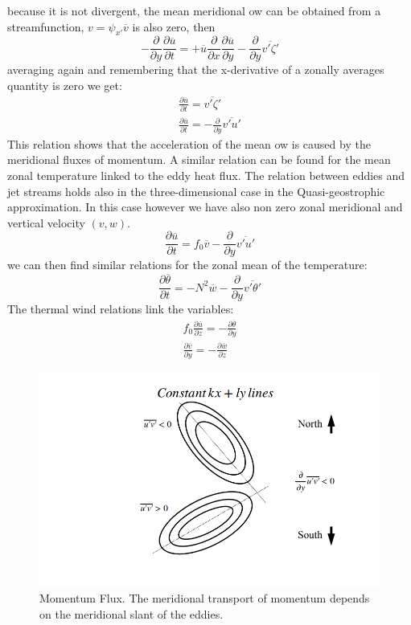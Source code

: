 because it is not divergent, the mean meridional ow can be obtained from a streamfunction, $v=\psi_{x'}\overline{v}$ is also zero, then
$$-\frac{\partial}{\partial y}\frac{\partial\overline{u}}{\partial t}=+\overline{u}\frac{\partial}{\partial x}\frac{\partial\overline{u}}{\partial y}-\frac{\partial}{\partial y}\overline{v'\zeta'}$$
averaging again and remembering that the x-derivative of a zonally averages quantity is zero we get:
\begin{align*}
	\frac{\partial\overline{u}}{\partial t}=\overline{v'\zeta'} \\
	\frac{\partial\overline{u}}{\partial t}=-\frac{\partial}{\partial y}\overline{v'u'}
\end{align*}
This relation shows that the acceleration of the mean ow is caused by the meridional fluxes of momentum. A similar relation can be found for the mean zonal temperature linked to the eddy heat flux. The relation between eddies and jet streams holds also in the three-dimensional case in the Quasi-geostrophic approximation. In this case however we have also non zero
zonal meridional and vertical velocity $(v,w)$.
$$\frac{\partial\overline{u}}{\partial t}=f_0\overline{v}-\frac{\partial}{\partial y}\overline{v'u'}$$
we can then find similar relations for the zonal mean of the temperature:
\begin{equation}\label{eq.zonal mean of temperature}
	\frac{\partial\overline{\theta}}{\partial t}=-N^2\overline{w}-\frac{\partial}{\partial y}\overline{v'\theta'}
\end{equation}
The thermal wind relations link the variables:
\begin{align}\label{eq.thermal wind}
	f_0\frac{\partial\overline{u}}{\partial z}=-\frac{\partial\overline{\theta}}{\partial y} \\
	\frac{\partial\overline{v}}{\partial y}=-\frac{\partial\overline{w}}{\partial z}
\end{align}
\begin{figure}[htp!]
	\centering
	\includegraphics[width=0.5\linewidth]{uploads/Screenshot 2024-11-22 202457.png}
	\caption{Momentum Flux. The meridional transport of momentum depends on the meridional slant of the eddies.}
	\label{fig:enter-label}
\end{figure}

